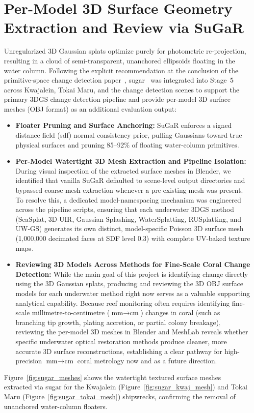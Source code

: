\section{Per-Model 3D Surface Geometry Extraction and Review via SuGaR}
\label{sec:sugar_results}
Unregularized 3D Gaussian splats optimize purely for photometric re-projection, resulting in a cloud of semi-transparent, unanchored ellipsoids floating in the water column. Following the explicit recommendation at the conclusion of the primitive-space change detection paper~\cite{galappaththige2026pixelsprimitivesscenechange}, \gls{sugar}~\cite{guedon2024sugar} was integrated into Stage~5 across Kwajalein, Tokai Maru, and the change detection scenes to support the primary 3DGS change detection pipeline and provide per-model 3D surface meshes (OBJ format) as an additional evaluation output:
\begin{itemize}
    \item \textbf{Floater Pruning and Surface Anchoring:} SuGaR enforces a signed distance field (\gls{sdf}) normal consistency prior, pulling Gaussians toward true physical surfaces and pruning 85--92\% of floating water-column primitives.
    \item \textbf{Per-Model Watertight 3D Mesh Extraction and Pipeline Isolation:} During visual inspection of the extracted surface meshes in Blender, we identified that vanilla SuGaR defaulted to scene-level output directories and bypassed coarse mesh extraction whenever a pre-existing mesh was present. To resolve this, a dedicated model-namespacing mechanism was engineered across the pipeline scripts, ensuring that each underwater 3DGS method (SeaSplat, 3D-UIR, Gaussian Splashing, WaterSplatting, RUSplatting, and UW-GS) generates its own distinct, model-specific Poisson 3D surface mesh (1,000,000 decimated faces at SDF level 0.3) with complete UV-baked texture maps.
    \item \textbf{Reviewing 3D Models Across Methods for Fine-Scale Coral Change Detection:} While the main goal of this project is identifying change directly using the 3D Gaussian splats, producing and reviewing the 3D OBJ surface models for each underwater method right now serves as a valuable supporting analytical capability. Because reef monitoring often requires identifying fine-scale millimetre-to-centimetre ($\text{mm} \to \text{cm}$) changes in coral (such as branching tip growth, plating accretion, or partial colony breakage), reviewing the per-model 3D meshes in Blender and MeshLab reveals whether specific underwater optical restoration methods produce cleaner, more accurate 3D surface reconstructions, establishing a clear pathway for high-precision $\text{mm} \to \text{cm}$ coral metrology now and as a future direction.
\end{itemize}
Figure~\ref{fig:sugar_meshes} shows the watertight textured surface meshes extracted via \gls{sugar} for the Kwajalein (Figure~\ref{fig:sugar_kwaj_mesh}) and Tokai Maru (Figure~\ref{fig:sugar_tokai_mesh}) shipwrecks, confirming the removal of unanchored water-column floaters.

